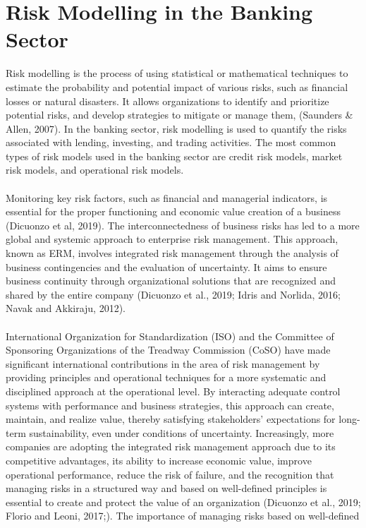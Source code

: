 \section{Risk Modelling in the Banking Sector}
Risk modelling is the process of using statistical or mathematical techniques to estimate the probability and
potential impact of various risks, such as financial losses or natural disasters. It allows organizations to
identify and prioritize potential risks, and develop strategies to mitigate or manage them,
(Saunders \& Allen, 2007). In the banking sector, risk modelling is used to quantify the risks associated with
lending, investing, and trading activities. The most common types of risk models used in the banking sector
are credit risk models, market risk models, and operational risk models.\\\\
Monitoring key risk factors, such as financial and managerial indicators, is essential for the proper functioning
and economic value creation of a business (Dicuonzo et al, 2019). The interconnectedness of business risks has
led to a more global and systemic approach to enterprise risk management. This approach, known as ERM, involves
integrated risk management through the analysis of business contingencies and the evaluation of uncertainty.
It aims to ensure business continuity through organizational solutions that are recognized and shared by the
entire company (Dicuonzo et al., 2019; Idris and Norlida, 2016; Navak and Akkiraju, 2012).\\\\
International Organization for Standardization (ISO) and the Committee of Sponsoring Organizations of the Treadway
Commission (CoSO) have made significant international contributions in the area of risk management by providing
principles and operational techniques for a more systematic and disciplined approach at the operational level.
By interacting adequate control systems with performance and business strategies, this approach can create,
maintain, and realize value, thereby satisfying stakeholders' expectations for long-term sustainability,
even under conditions of uncertainty. Increasingly, more companies are adopting the integrated risk management
approach due to its competitive advantages, its ability to increase economic value, improve operational
performance, reduce the risk of failure, and the recognition that managing risks in a structured way and
based on well-defined principles is essential to create and protect the value of an organization 
(Dicuonzo et al., 2019; Florio and Leoni, 2017;). The importance of managing risks based on well-defined 
